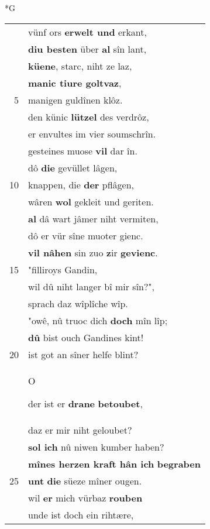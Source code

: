 \documentclass[8pt,a4paper,notitlepage]{article}
\begin{document}
\newpage
\begin{table}[ht]
\begin{minipage}[t]{0.5\linewidth}
\small
\begin{center}*G
\end{center}
\begin{tabular}{rl}
 & vünf ors \textbf{erwelt und} erkant,\\ 
 & \textbf{diu besten} über \textbf{al} sîn lant,\\ 
 & \textbf{küene}, starc, niht ze laz,\\ 
 & \textbf{manic tiure goltvaz},\\ 
5 & manigen guldînen klôz.\\ 
 & den künic \textbf{lützel} des verdrôz,\\ 
 & er envultes im vier soumschrîn.\\ 
 & gesteines muose \textbf{vil} dar în.\\ 
 & dô \textbf{die} gevüllet lâgen,\\ 
10 & knappen, die \textbf{der} pflâgen,\\ 
 & wâren \textbf{wol} gekleit und geriten.\\ 
 & \textbf{al} dâ wart jâmer niht vermiten,\\ 
 & dô er vür sîne muoter gienc.\\ 
 & \textbf{vil nâhen} sin zuo \textbf{z}ir \textbf{gevienc}.\\ 
15 & "filliroys Gandin,\\ 
 & wil dû niht langer bî mir sîn?",\\ 
 & sprach daz wîplîche wîp.\\ 
 & "owê, nû truoc dich \textbf{doch} mîn lîp;\\ 
 & \textbf{dû} bist ouch Gandines kint!\\ 
20 & ist got an sîner helfe blint?\\ 
 & \begin{large}O\end{large}der ist er \textbf{drane} \textbf{betoubet},\\ 
 & daz er mir niht geloubet?\\ 
 & \textbf{sol ich} nû niwen kumber haben?\\ 
 & \textbf{mînes herzen kraft hân ich} \textbf{begraben}\\ 
25 & \textbf{unt} \textbf{die} süeze mîner ougen.\\ 
 & wil \textbf{er} mich vürbaz \textbf{rouben}\\ 
 & unde ist doch ein rihtære,\\ 

\end{tabular}
\end{minipage}
\end{table}
\end{document}
